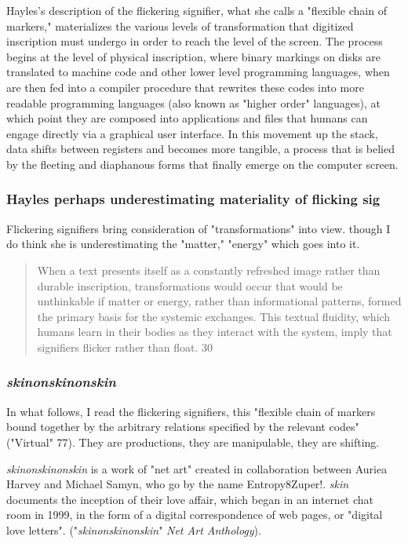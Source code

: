 \documentclass[11pt]{article}
\begin{document}
Hayles's description of the flickering signifier, what she calls a
"flexible chain of markers," materializes the various levels of
transformation that digitized inscription must undergo in order to
reach the level of the screen. The process begins at the level of
physical inscription, where binary markings on disks are translated to
machine code and other lower level programming languages, when are
then fed into a compiler procedure that rewrites these codes into more
readable programming languages (also known as "higher order"
languages), at which point they are composed into applications and
files that humans can engage directly via a graphical user
interface. In this movement up the stack, data shifts between
registers and becomes more tangible, a process that is belied by the
fleeting and diaphanous forms that finally emerge on the computer
screen.

\subsubsection{Hayles perhaps underestimating materiality of flicking sig}
\label{sec:org02f941a}
Flickering signifiers bring consideration of "transformations" into
view. though I do think she is underestimating the "matter," "energy"
which goes into it. 
\begin{quote}
When a text presents itself as a constantly refreshed image rather
than durable inscription, transformations would occur that would be
unthinkable if matter or energy, rather than informational patterns,
formed the primary basis for the systemic exchanges. This textual
fluidity, which humans learn in their bodies as they interact with the
system, imply that signifiers flicker rather than float. 30
\end{quote}

\subsubsection{\emph{skinonskinonskin}}
\label{sec:org9f3d3ec}
In what follows, I read the flickering signifiers, this "flexible
chain of markers bound together by the arbitrary relations specified
by the relevant codes" ("Virtual" 77). They are productions, they are
manipulable, they are shifting.  

\emph{skinonskinonskin} is a work of "net art" created in collaboration
between Auriea Harvey and Michael Samyn, who go by the name
Entropy8Zuper!. \emph{skin} documents the inception of their love affair,
which began in an internet chat room in 1999, in the form of a digital
correspondence of web pages, or "digital love letters".
("\emph{skinonskinonskin}" \emph{Net Art Anthology}).
\end{document}
